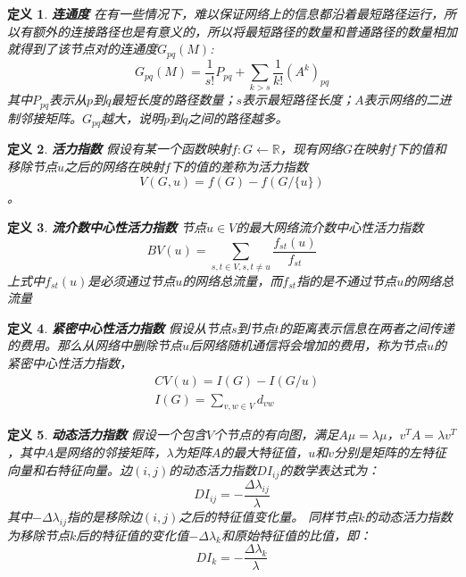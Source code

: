 \documentclass{ctexart}
\newtheorem{Definition}{\hspace{2em}定义}[section]
\begin{document}
                \begin{Definition}
                    \textbf{连通度} 在有一些情况下，难以保证网络上的信息都沿着最短路径运行，所以有额外的连接路径也是有意义的，所以将最短路径的数量和普通路径的数量相加就得到了该节点对的连通度$G_{pq}(M)$:
                    $$
                        G_{pq}(M) = \frac{1}{s!}P_{pq} + \sum_{k > s}\frac{1}{k!}(A^k)_{pq}
                    $$
                    其中$P_{pq}$表示从$p$到$q$最短长度的路径数量；$s$表示最短路径长度；$A$表示网络的二进制邻接矩阵。$G_{pq}$越大，说明$p$到$q$之间的路径越多。
                \end{Definition}
                \begin{Definition}
                    \textbf{活力指数} 假设有某一个函数映射$f:G\leftarrow \mathbb{R}$，现有网络$G$在映射$f$下的值和移除节点$u$之后的网络在映射$f$下的值的差称为活力指数$$V(G,u)=f(G)-f(G/\{u\})$$。
                \end{Definition}

                \begin{Definition}
                    \textbf{流介数中心性活力指数} 节点$u\in V$的最大网络流介数中心性活力指数
                    $$
                        BV(u) = \sum_{s,t\in V,s,t\ne u}\frac{f_{st}(u)}{f_{st}}
                    $$
                    上式中$f_{st}(u)$是必须通过节点$u$的网络总流量，而$f_{st}$指的是不通过节点$u$的网络总流量
                \end{Definition}

                \begin{Definition}
                    \textbf{紧密中心性活力指数} 假设从节点$s$到节点$t$的距离表示信息在两者之间传递的费用。那么从网络中删除节点$u$后网络随机通信将会增加的费用，称为节点$u$的紧密中心性活力指数，
                    \begin{equation}
                        \begin{split}
                            &CV(u) = I(G) - I(G/{u}) \\
                            &I(G) = \sum_{v,w\in V} d_{vw}
                        \end{split}
                    \end{equation}
                \end{Definition}
                \begin{Definition}
                    \textbf{动态活力指数} 假设一个包含$V$个节点的有向图，满足$A\mu = \lambda \mu$，$v^TA=\lambda v^T$，其中$A$是网络的邻接矩阵，$\lambda$为矩阵$A$的最大特征值，$u$和$v$分别是矩阵的左特征向量和右特征向量。边$(i,j)$的动态活力指数$DI_{ij}$的数学表达式为：
                    $$
                        DI_{ij}=-\frac{\Delta \lambda_{ij}}{\lambda}
                    $$
                    其中$-\Delta\lambda_{ij}$指的是移除边$(i,j)$之后的特征值变化量。
                    同样节点$k$的动态活力指数为移除节点$k$后的特征值的变化值$-\Delta \lambda_k$和原始特征值的比值，即：
                    $$
                        DI_k = -\frac{\Delta \lambda_k}{\lambda}
                    $$
                \end{Definition}
\end{document}
